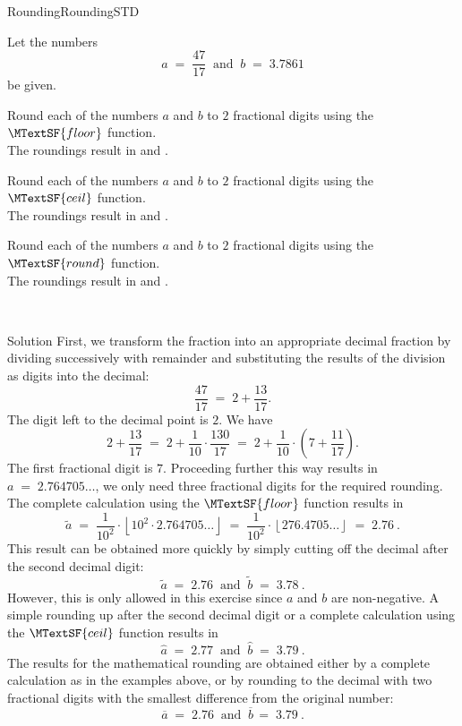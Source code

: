 \begin{MXContent}{Rounding}{Rounding}{STD}
\begin{MExercise}
Let the numbers 
$$
a\; =\; \frac{47}{17} \;\;\text{and}\;\;  b\; =\; 3.7861
$$
be given.
\begin{MExerciseItems}
\item{Round each of the numbers $a$ and $b$ to $2$ fractional digits using the $\MTextSF{floor}$ function.\\The roundings result in
 and .}
\item{Round each of the numbers $a$ and $b$ to $2$ fractional digits using the $\MTextSF{ceil}$ function.\\The roundings result in
 and .}
\item{Round each of the numbers $a$ and $b$ to $2$ fractional digits using the $\MTextSF{round}$ function.\\The roundings result in
 and .}
\end{MExerciseItems}
\ \\
\begin{MHint}{Solution}
First, we transform the fraction into an appropriate decimal fraction by dividing successively with remainder
and substituting the results of the division as digits into the decimal:
$$
\frac{47}{17} \;=\; 2+\frac{13}{17}.
$$
The digit left to the decimal point is $2$. We have
$$
2+\frac{13}{17} \;=\; 2+\frac1{10}\cdot \frac{130}{17} \;=\; 2+\frac1{10}\cdot\left({7+\frac{11}{17}}\right).
$$
The first fractional digit is $7$. Proceeding further this way results in $a\;=\;  2.764705\ldots$, 
we only need three fractional digits for the required rounding. The complete calculation using the 
$\MTextSF{floor}$ function results in
$$
\tilde a \;=\; \frac1{10^2}\cdot \left\lfloor{ 10^2\cdot 2.764705\ldots}\right\rfloor \;=\; \frac1{10^2}\cdot \left\lfloor{ 276.4705\ldots}\right\rfloor \;=\;  2.76\: .
$$
This result can be obtained more quickly by simply cutting off the decimal after the second decimal digit:
$$
\tilde a \;=\; 2.76\;\; \text{and}\;\; \tilde b \;=\; 3.78\: .
$$
However, this is only allowed in this exercise since $a$ and $b$ are non-negative. 
A simple rounding up after the second decimal digit or a complete calculation using the $\MTextSF{ceil}$ function 
results in
$$
\hat a \;=\; 2.77\;\; \text{and}\;\; \hat b \;=\; 3.79\: .
$$
The results for the mathematical rounding are obtained either by a complete calculation as in the examples above, or 
by rounding to the decimal with two fractional digits with the smallest difference from the original number:
$$
\overline{a} \; = \; 2.76 \;\; \text{and}\;\; \overline{b} \,=\; 3.79\: .
$$
\end{MHint}
\end{MExercise}

\end{MXContent}

